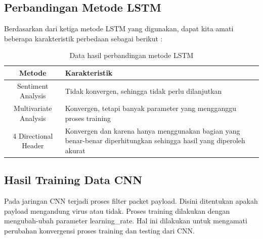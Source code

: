 \documentclass[./skripsi.tex]{subfiles}
\begin{document}
\subsection{Perbandingan Metode LSTM}
\par Berdasarkan dari ketiga metode LSTM yang digunakan, dapat kita amati beberapa karakteristik perbedaan sebagai berikut :
\begin{table}%
\begin{tabularx}{\textwidth}{
                |c
                |p{}|}
\hline
Metode & Karakteristik \\
\hline
Sentiment Analysis & Tidak konvergen, sehingga tidak perlu dilanjutkan \\
\hline
Multivariate Analysis & Konvergen, tetapi banyak parameter yang mengganggu proses training \\
\hline
4 Directional Header & Konvergen dan karena hanya menggunakan bagian yang benar-benar diperhitungkan sehingga hasil yang diperoleh akurat \\
\hline
\end{tabularx}
\caption{Data hasil perbandingan metode LSTM}
\label{table:data_perbandingan_lstm}
\end{table}
\subsection{Hasil Training Data CNN}
\par Pada jaringan CNN terjadi proses filter packet payload. Disini ditentukan apakah payload mengandung virus atau tidak. Proses training dilakukan dengan mengubah-ubah parameter learning\_rate. Hal ini dilakukan untuk mengamati perubahan konvergensi proses training dan testing dari CNN.

\end{document}
